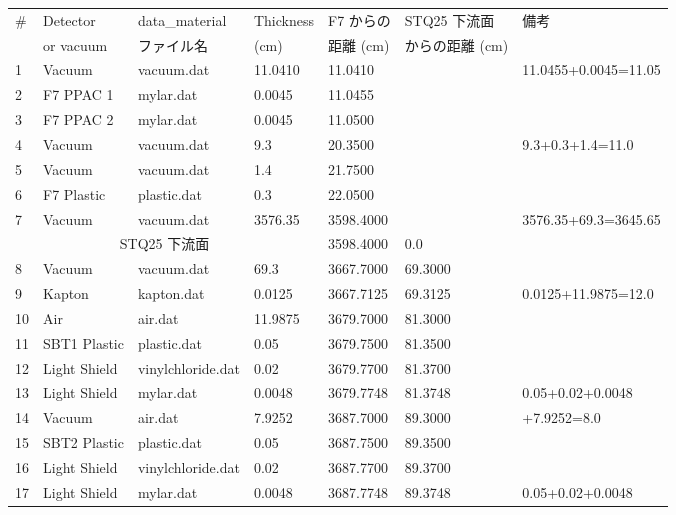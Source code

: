 \begin{table}
    \centering
    \begin{tabular}{lllllll} \\ \hline
    \# & Detector   & data\_material & Thickness & F7 からの & STQ25 下流面 & 備考    \\
       & or vacuum  & ファイル名        & (cm)      & 距離 (cm) & からの距離 (cm) & \\
    \hline
    1 & Vacuum      & vacuum.dat  & 11.0410 &  11.0410 &  &    11.0455+0.0045=11.05 \\
    2 & F7 PPAC 1   & mylar.dat   & 0.0045  &  11.0455 &  & \\
    3 & F7 PPAC 2   & mylar.dat   & 0.0045  &  11.0500 &  & \\ \hline
    4 & Vacuum      & vacuum.dat  & 9.3     &  20.3500 &  & 9.3+0.3+1.4=11.0 \\
    5 & Vacuum      & vacuum.dat  & 1.4     &  21.7500 &  & \\
    6 & F7 Plastic  & plastic.dat & 0.3     &  22.0500 &  & \\ \hline
    7 & Vacuum      & vacuum.dat  & 3576.35 & 3598.4000 & &        3576.35+69.3=3645.65 \\
    \cline{1-6}
    \multicolumn{4}{c}{STQ25 下流面}          & 3598.4000 & 0.0 & \\
    \cline{1-6}
    8 & Vacuum      & vacuum.dat  & 69.3    & 3667.7000 & 69.3000 & \\
    \hline
    9 & Kapton      & kapton.dat  & 0.0125  & 3667.7125 & 69.3125 & 0.0125+11.9875=12.0 \\
    10& Air         & air.dat     & 11.9875 & 3679.7000 & 81.3000 & \\
    \hline
    11& SBT1 Plastic& plastic.dat & 0.05    & 3679.7500 & 81.3500 & \\
    12& Light Shield&vinylchloride.dat& 0.02& 3679.7700 & 81.3700 & \\
    13& Light Shield&mylar.dat  & 0.0048 & 3679.7748 & 81.3748 & 0.05+0.02+0.0048 \\
    \cline{1-6}
    14 & Vacuum         & air.dat    & 7.9252 & 3687.7000 & 89.3000 &    +7.9252=8.0 \\ 
    \hline
    15 & SBT2 Plastic & plastic.dat & 0.05  & 3687.7500 & 89.3500 & \\
    16 & Light Shield& vinylchloride.dat & 0.02 & 3687.7700 & 89.3700 & \\
    17 & Light Shield & mylar.dat  & 0.0048 & 3687.7748 & 89.3748 &0.05+0.02+0.0048 \\

\end{tabular}
\end{table}
